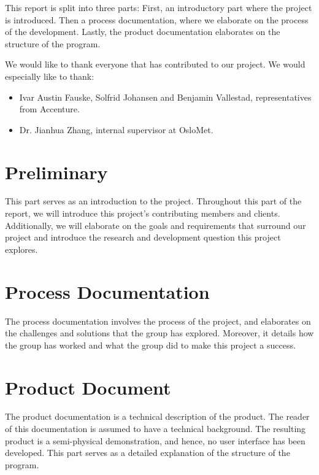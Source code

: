 \documentclass[14pt, a4paper, english]{report}
\begin{document}
	This report is split into three parts: First, an introductory part where the project is introduced. Then a process documentation, where we elaborate on the process of the development. Lastly, the product documentation elaborates on the structure of the program.
	
	We would like to thank everyone that has contributed to our project. We would especially like to thank:
	\begin{itemize}
		\item Ivar Austin Fauske, Solfrid Johansen and Benjamin Vallestad, representatives from Accenture.
		\item Dr. Jianhua Zhang, internal supervisor at OsloMet.
	\end{itemize}
	\part{Preliminary}
	This part serves as an introduction to the project. Throughout this part of the report, we will introduce this project's contributing members and clients. Additionally, we will elaborate on the goals and requirements that surround our project and introduce the research and development question this project explores.
	
	
	\part{Process Documentation}
	The process documentation involves the process of the project, and elaborates on the challenges and solutions that the group has explored. Moreover, it details how the group has worked and what the group did to make this project a success.
	
	
	
	
	\part{Product Document}
	The product documentation is a technical description of the product. The reader of this documentation is assumed to have a technical background. The resulting product is a semi-physical demonstration, and hence, no user interface has been developed. This part serves as a detailed explanation of the structure of the program. 
	
%	
\end{document}
